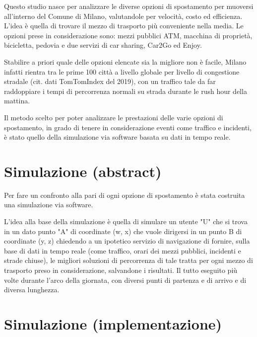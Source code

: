 Questo studio nasce per analizzare le diverse opzioni di spostamento per muoversi all'interno del Comune di Milano, valutandole per velocità, costo ed efficienza. L'idea è quella di trovare il mezzo di trasporto più conveniente nella media. Le opzioni prese in considerazione sono: mezzi pubblici ATM, macchina di proprietà, bicicletta, pedovia e due servizi di car sharing, Car2Go ed Enjoy.

Stabilire a priori quale delle opzioni elencate sia la migliore non è facile, Milano infatti rientra tra le prime 100 città a livello globale per livello di congestione stradale (cit. dati TomTomIndex del 2019), con un traffico tale da far raddoppiare i tempi di percorrenza normali su strada durante le rush hour della mattina.

Il metodo scelto per poter analizzare le prestazioni delle varie opzioni di spostamento, in grado di tenere in considerazione eventi come traffico e incidenti, è stato quello della simulazione via software basata su dati in tempo reale.



\section{Simulazione (abstract)}

Per fare un confronto alla pari di ogni opzione di spostamento è stata costruita una simulazione via software.

L'idea alla base della simulazione è quella di simulare un utente "U" che si trova in un dato punto "A" di coordinate (w, x) che vuole dirigersi in un punto B di coordinate (y, z) chiedendo a un ipotetico servizio di navigazione di fornire, sulla base di dati in tempo reale (come traffico, orari dei mezzi pubblici, incidenti e strade chiuse), le migliori soluzioni di percorrenza di tale tratta per ogni mezzo di trasporto preso in considerazione, salvandone i risultati. Il tutto eseguito più volte durante l'arco della giornata, con diversi punti di partenza e di arrivo e di diversa lunghezza.


\section{Simulazione (implementazione)}

